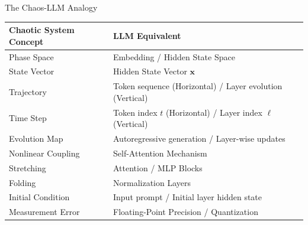 \documentclass[10pt,aspectratio=169]{beamer}
\begin{document}
\begin{frame}{The Chaos-LLM Analogy}
  \centering
  \renewcommand{\arraystretch}{1.2}
  \footnotesize
  \begin{tabular}{l l}
    \toprule
    \textbf{Chaotic System Concept} & \textbf{LLM Equivalent} \\ 
    \midrule
    Phase Space & Embedding / Hidden State Space \\
    State Vector & Hidden State Vector $\mathbf{x}$ \\
    Trajectory & Token sequence (Horizontal) / Layer evolution (Vertical) \\
    Time Step & Token index $t$ (Horizontal) / Layer index $\ell$ (Vertical) \\
    Evolution Map & Autoregressive generation / Layer-wise updates \\
    Nonlinear Coupling & Self-Attention Mechanism \\
    Stretching & Attention / MLP Blocks \\
    Folding & Normalization Layers \\
    Initial Condition & Input prompt / Initial layer hidden state \\
    Measurement Error & Floating-Point Precision / Quantization \\ 
    \bottomrule
  \end{tabular}
\end{frame}
\end{document}
